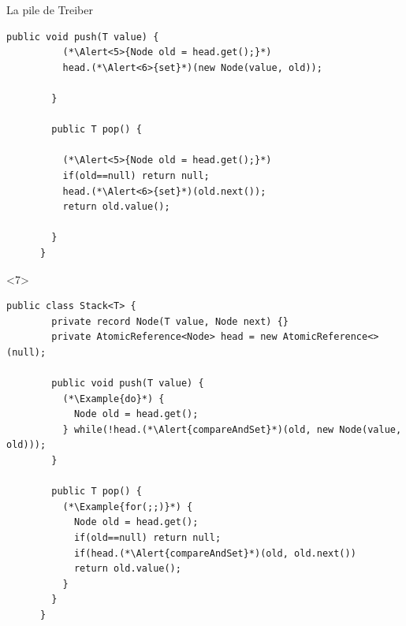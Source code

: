 \begin{frame}[fragile]{La pile de Treiber}
\begin{onlyenv}
\begin{lstlisting}[gobble=6]
        public void push(T value) {
          (*\Alert<5>{Node old = head.get();}*)
          head.(*\Alert<6>{set}*)(new Node(value, old));
          
        }
        
        public T pop() {
          
          (*\Alert<5>{Node old = head.get();}*)
          if(old==null) return null;
          head.(*\Alert<6>{set}*)(old.next());
          return old.value();
          
        }
      }
    \end{lstlisting}
  \end{onlyenv}
  \begin{onlyenv}<7>
    \begin{lstlisting}[gobble=6]
      public class Stack<T> {
        private record Node(T value, Node next) {}
        private AtomicReference<Node> head = new AtomicReference<>(null);
        
        public void push(T value) {
          (*\Example{do}*) {
            Node old = head.get();
          } while(!head.(*\Alert{compareAndSet}*)(old, new Node(value, old)));
        }
        
        public T pop() {
          (*\Example{for(;;)}*) {
            Node old = head.get();
            if(old==null) return null;
            if(head.(*\Alert{compareAndSet}*)(old, old.next())
            return old.value();
          }
        }
      }
    \end{lstlisting}
  \end{onlyenv}

  

\end{frame}
